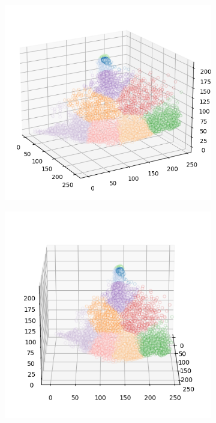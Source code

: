 \begin{figure}[htbp]
\begin{subfigure}[t]{0.32\textwidth}
    \end{subfigure}
    \begin{subfigure}[t]{0.32\textwidth}
        \includegraphics[width=\linewidth]{../../python_code/plots/kmeans/flower-14/clusters_elev20_azim-30.png}
    \end{subfigure}
    \begin{subfigure}[t]{0.32\textwidth}
        \includegraphics[width=\linewidth]{../../python_code/plots/kmeans/flower-14/clusters_elev20_azim0.png}

\end{subfigure}
\end{figure}
